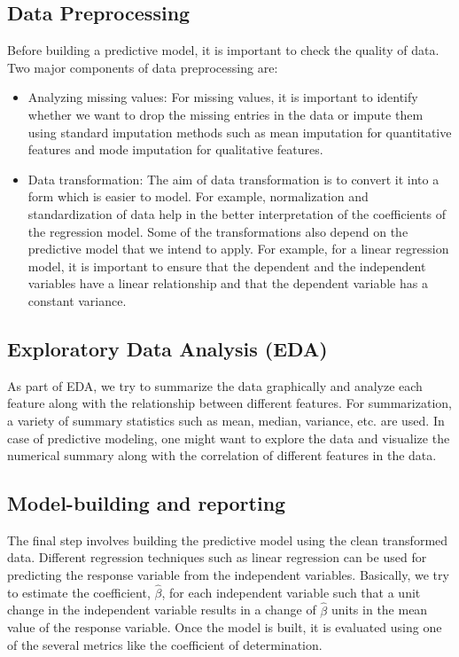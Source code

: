 \documentclass[sigconf]{acmart}
\begin{document}
\subsection{Data Preprocessing} 
Before building a predictive model, it is important to check the quality of data. Two major components of data preprocessing are:
\begin{itemize}
	\item Analyzing missing values: For missing values, it is important to identify whether we want to drop the missing entries in the data or impute them using standard imputation methods such as mean imputation for quantitative features and mode imputation for qualitative features.
	\item Data transformation: The aim of data transformation is to convert it into a form which is easier to model. For example, normalization and standardization of data help in the better interpretation of the coefficients of the regression model. Some of the transformations also depend on the predictive model that we intend to apply. For example, for a linear regression model, it is important to ensure that the dependent and the independent variables have a linear relationship and that the dependent variable has a constant variance.
\end{itemize}
\subsection{Exploratory Data Analysis (EDA)} 
As part of EDA, we try to summarize the data graphically and analyze each feature along with the relationship between different features. For summarization, a variety of summary statistics such as mean, median, variance, etc. are used. In case of predictive modeling, one might want to explore the data and visualize the numerical summary along with the correlation of different features in the data.
\subsection{Model-building and reporting}
The final step involves building the predictive model using the clean transformed data. Different regression techniques such as linear regression can be used for predicting the response variable from the independent variables. Basically, we try to estimate the coefficient, $\hat{\beta}$, for each independent variable such that a unit change in the independent variable results in a change of $\hat{\beta}$ units in the mean value of the response variable. Once the model is built, it is evaluated using one of the several metrics like the coefficient of determination.
\end{document}

